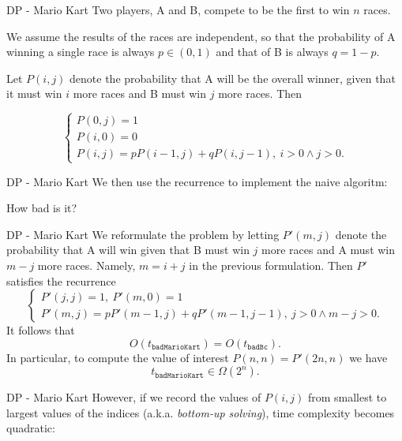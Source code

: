 \documentclass{beamer}
\begin{document}
\begin{frame}{DP - Mario Kart}
	Two players, A and B, compete to be the first to win $n$ races.

	\bigskip
	We assume the results of the races are independent, so that the probability
	of A winning a single race is always $p \in (0,1)$ and  that of B is always
	$q = 1-p$.

	\bigskip
	Let $P(i,j)$ denote the probability that A will be the overall winner, given
	that it must win $i$ more races and B must win $j$ more races. Then

	\[
		\begin{cases}
			P(0,j) = 1\\
			P(i,0) = 0\\ 
			P(i,j) = pP(i-1,j) + qP(i,j-1),\ i > 0 \land j > 0.
		\end{cases}
	\]
\end{frame}

%

\begin{frame}{DP - Mario Kart}
	We then use the recurrence to implement the naive algoritm:
	
	How bad is it?
\end{frame}

%

\begin{frame}{DP - Mario Kart}
	We reformulate the problem by letting $P'(m,j)$ denote the probability that
	A will win given that B must win $j$ more races and A must win $m-j$ more
	races. Namely, $m = i+j$ in the previous formulation. Then $P'$ satisfies
	the recurrence
	\[
		\begin{cases}
			P'(j,j)= 1,\ P'(m,0)= 1\\
			P'(m,j) = pP'(m-1,j) + qP'(m-1,j-1),\ j > 0 \land m-j > 0.
		\end{cases}
	\]
	It follows that
	\[
		O(t_{\texttt{badMarioKart}}) = O(t_{\texttt{badBc}}).
	\]
	In particular, to compute the value of interest $P(n,n) = P'(2n,n)$ we have
	\[
		t_{\texttt{badMarioKart}} \in \Omega(2^n).
	\]
\end{frame}

%

\begin{frame}{DP - Mario Kart}
	However, if we record the values of $P(i,j)$ from smallest to largest values
	of the indices (a.k.a. \emph{bottom-up solving}), time complexity becomes
	quadratic:
	
\end{frame} %
\end{document}
